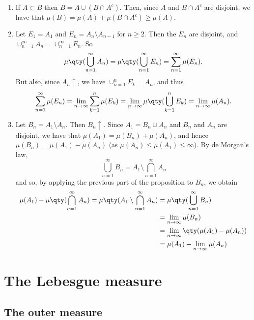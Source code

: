 \documentclass{maths}
\begin{document}
\begin{prf}
    \begin{enumerate}
        \item If $A\subset B$ then $B = A\cup(B\cap A^c)$.
        Then, since $A$ and $B\cap A^{c}$ are disjoint, we have that $\mu(B) = \mu(A) + \mu(B\cap A^c) \geqslant \mu(A)$.
        \item Let $E_1 = A_1$ and $E_n = A_n\setminus A_{n-1}$ for $n\geq2$.
        Then the $E_n$ are disjoint, and $\cup_{n=1}^{\infty} A_n = \cup_{n=1}^{\infty} E_n$.
        So
        \[
            \mu\qty(\bigcup_{n=1}^{\infty} A_n) = \mu\qty(\bigcup_{n=1}^{\infty} E_n) = \sum_{n=1}^{\infty} \mu(E_n).  
        \]
        But also, since $A_n\uparrow$, we have $\cup_{n=1}^n E_k = A_n$, and thus
        \[
            \sum_{n=1}^{\infty} \mu(E_n) =
            \lim_{n\to\infty} \sum_{k=1}^n \mu(E_k) =
            \lim_{n\to\infty} \mu\qty(\bigcup_{k=1}^n E_k) =
            \lim_{n\to\infty} \mu(A_n).
        \]
        \item Let $B_n = A_1\setminus A_n$.
        Then $B_n\uparrow$.
        Since $A_1 = B_n\cup A_n$ and $B_n$ and $A_n$ are disjoint, we have that $\mu(A_1) = \mu(B_n) + \mu(A_n)$, and hence $\mu(B_n) = \mu(A_1) - \mu(A_n)$ (as $\mu(A_n)\leqslant\mu(A_1)\leqslant\infty$).
        By de Morgan's law,
        \[
            \bigcup_{n=1}^{\infty} B_n =
            A_1\setminus\bigcap_{n=1}^{\infty} A_n
        \]
        and so, by applying the previous part of the proposition to $B_n$, we obtain
        \begin{align*}
            \mu(A_1) - \mu\qty(\bigcap_{n=1}^{\infty} A_n) =
            \mu\qty(A_1\setminus\bigcap_{n=1}^{\infty} A_n)
            &= \mu\qty(\bigcup_{n=1}^{\infty} B_n)\\
            &= \lim_{n\to\infty} \mu(B_n)\\
            &= \lim_{n\to\infty} \qty(\mu(A_1) - \mu(A_n))\\
            &= \mu(A_1) - \lim_{n\to\infty} \mu(A_n)
        \end{align*}
    \end{enumerate}
\end{prf}

\section{The Lebesgue measure}

\subsection{The outer measure}
\end{document}

